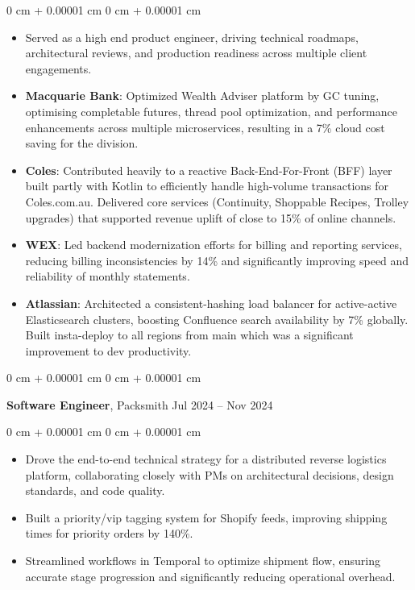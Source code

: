 \documentclass[10pt, letterpaper]{article}
\newenvironment{highlights}{
    \begin{itemize}[
        topsep=0.20 cm,     %
        parsep=0.20 cm,     %
        partopsep=0pt,
        itemsep=0.15cm,     %
        leftmargin=0 cm + 10pt
    ]
}{
    \end{itemize}
} %
\newenvironment{onecolentry}{
    \begin{adjustwidth}{
        0 cm + 0.00001 cm
    }{
        0 cm + 0.00001 cm
    }
}{
    \end{adjustwidth}
} %
\newenvironment{twocolentry}[2][]{
    \onecolentry
    \def\secondColumn{#2}
    \setcolumnwidth{\fill, 4.5 cm}
    \begin{paracol}{2}
}{
    \switchcolumn \raggedleft \secondColumn
    \end{paracol}
    \endonecolentry
} %
\begin{document}
        \vspace{0.20 cm} %
        \begin{onecolentry}
            \begin{highlights}
                \item Served as a high end product engineer, driving technical roadmaps, architectural reviews, and production readiness across multiple client engagements.
                \item \textbf{Macquarie Bank}: Optimized Wealth Adviser platform by GC tuning, optimising completable futures, thread pool optimization, and performance enhancements across multiple microservices, resulting in a 7\% cloud cost saving for the division.
                \item \textbf{Coles}: Contributed heavily to a reactive Back-End-For-Front (BFF) layer built partly with Kotlin to efficiently handle high-volume transactions for Coles.com.au. Delivered core services (Continuity, Shoppable Recipes, Trolley upgrades) that supported revenue uplift of close to 15\% of online channels.
                \item \textbf{WEX}: Led backend modernization efforts for billing and reporting services, reducing billing inconsistencies by 14\% and significantly improving speed and reliability of monthly statements.
                \item \textbf{Atlassian}: Architected a consistent-hashing load balancer for active-active Elasticsearch clusters, boosting Confluence search availability by 7\% globally. Built insta-deploy to all regions from main which was a significant improvement to dev productivity.
            \end{highlights}
        \end{onecolentry}

        \vspace{0.35 cm} %
        \begin{twocolentry}{
            Jul 2024 – Nov 2024
        }
            \textbf{Software Engineer}, Packsmith\end{twocolentry}

        \vspace{0.20 cm} %
        \begin{onecolentry}
            \begin{highlights}
                \item Drove the end-to-end technical strategy for a distributed reverse logistics platform, collaborating closely with PMs on architectural decisions, design standards, and code quality.
                \item Built a priority/vip tagging system for Shopify feeds, improving shipping times for priority orders by 140\%.
                \item Streamlined workflows in Temporal to optimize shipment flow, ensuring accurate stage progression and significantly reducing operational overhead.
            \end{highlights}
        \end{onecolentry}
        
\end{document}
